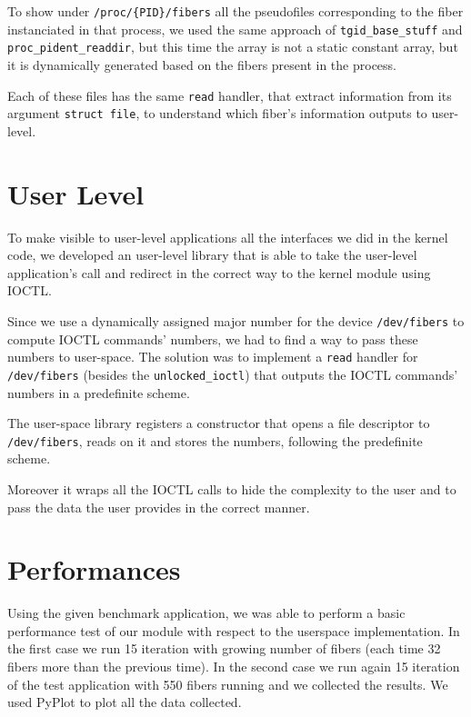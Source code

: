 \documentclass[a4paper]{article}
\begin{document}
To show under \texttt{/proc/\{PID\}/fibers} all the pseudofiles corresponding to the fiber instanciated in that process, we used the same approach of \texttt{tgid\_base\_stuff} and \texttt{proc\_pident\_readdir}, but this time the array is not a static constant array, but it is dynamically generated based on the fibers present in the process.

Each of these files has the same \texttt{read} handler, that extract information from its argument \texttt{struct file}, to understand which fiber's information outputs to user-level.

\section{User Level}
To make visible to user-level applications all the interfaces we did in the kernel code, we developed an user-level library that is able to take the user-level application's call and redirect in the correct way to the kernel module using IOCTL.

Since we use a dynamically assigned major number for the device \texttt{/dev/fibers} to compute IOCTL commands' numbers, we had to find a way to pass these numbers to user-space.
The solution was to implement a \texttt{read} handler for \texttt{/dev/fibers} (besides the \texttt{unlocked\_ioctl}) that outputs the IOCTL commands' numbers in a predefinite scheme.

The user-space library registers a constructor that opens a file descriptor to \texttt{/dev/fibers}, reads on it and stores the numbers, following the predefinite scheme.

Moreover it wraps all the IOCTL calls to hide the complexity to the user and to pass the data the user provides in the correct manner.



\section{Performances}
Using the given benchmark application, we was able to perform a basic performance test of our module with respect to the userspace implementation.
In the first case we run 15 iteration with growing number of fibers (each time 32 fibers more than the previous time).
In the second case we run again 15 iteration of the test application with 550 fibers running and we collected the results. We used PyPlot to plot all the data collected.
\end{document}
